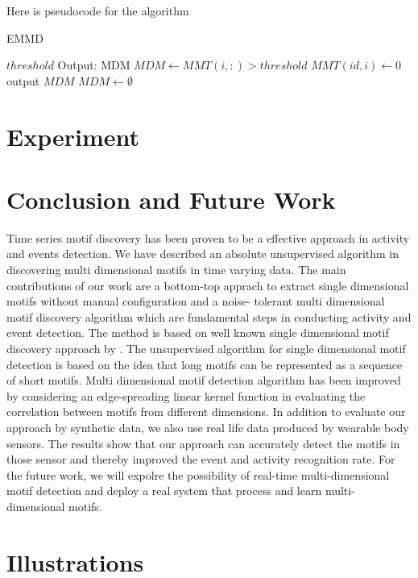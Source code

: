 \documentclass{article}
\begin{document}
Here is pseudocode for the algorithm

\begin{algorithm}
\caption{EMMD}
\begin{algorithmic} 
\REQUIRE $threshold$
\STATE Output: MDM
\STATE 	$ MDM \leftarrow MMT(i,:) > threshold$
\STATE $MMT(id,i) \leftarrow 0$
\STATE 	output $MDM$
\STATE 	$MDM \leftarrow \emptyset$
\ENDFOR
\ENDFOR
\end{algorithmic}
\end{algorithm}


\section{Experiment}


\section{Conclusion and Future Work}
Time series motif discovery has been proven to be a effective approach in activity and events detection. We have described an absolute unsupervised algorithm in discovering multi dimensional motifs in time varying data. The main contributions of our work are a bottom-top apprach to extract single dimensional motifs without manual configuration and a noise- tolerant multi dimensional motif discovery algorithm which are fundamental steps in conducting activity and event detection. The method is based on well known single dimensional motif discovery approach by \cite{Chiu03probabilisticdiscovery}. The unsupervised algorithm for single dimensional motif detection is based on the idea that long motifs can be represented as a sequence of short motifs. Multi dimensional motif detection algorithm has been improved by considering an edge-spreading linear kernel function in evaluating the correlation between motifs from different dimensions. In addition to evaluate our approach by synthetic data, we also use real life data produced by wearable body sensors. The results show that our approach can accurately detect the motifs in those sensor and thereby improved the event and activity recognition rate. For the future work, we will expolre the possibility of real-time multi-dimensional motif detection and deploy a real system that process and learn multi-dimensional motifs. 

\section{Illustrations}
\end{document}
